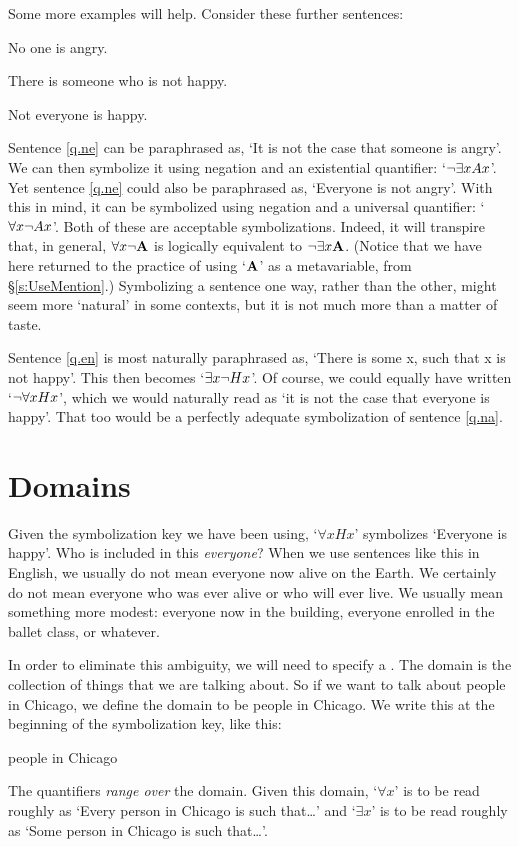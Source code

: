 
Some more examples will help. Consider these further sentences:
	\begin{earg}
		\item[\ex{q.ne}] No one is angry.
		\item[\ex{q.en}] There is someone who is not happy.
		\item[\ex{q.na}] Not everyone is happy.
	\end{earg}
Sentence \ref{q.ne} can be paraphrased as, `It is not the case that someone is angry'. We can then symbolize it using negation and an existential quantifier: `$\neg \exists x Ax$'. Yet sentence \ref{q.ne} could also be paraphrased as, `Everyone is not angry'. With this in mind, it can be symbolized using negation and a universal quantifier: `$\forall x \neg Ax$'. Both of these are acceptable symbolizations.  Indeed, it will transpire that, in general, $\forall x \neg\mathbf{A}$ is logically equivalent to $\neg\exists x\mathbf{A}$. (Notice that we have here returned to the practice of using `$\mathbf{A}$' as a metavariable, from \S\ref{s:UseMention}.) Symbolizing a sentence one way, rather than the other, might seem more `natural' in some contexts, but it is not much more than a matter of taste.

Sentence \ref{q.en} is most naturally paraphrased as, `There is some x, such that x is not happy'. This then becomes `$\exists x \neg Hx$'. Of course, we could equally have written `$\neg\forall x Hx$', which we would naturally read as `it is not the case that everyone is happy'. That too would be a perfectly adequate symbolization of sentence \ref{q.na}.


\section{Domains}
Given the symbolization key we have been using, `$\forall xHx$' symbolizes `Everyone is happy'.  Who is included in this \emph{everyone}? When we use sentences like this in English, we usually do not mean everyone now alive on the Earth. We certainly do not mean everyone who was ever alive or who will ever live. We usually mean something more modest: everyone now in the building, everyone enrolled in the ballet class, or whatever.

In order to eliminate this ambiguity, we will need to specify a . The domain is the collection of things that we are talking about. So if we want to talk about people in Chicago, we define the domain to be people in Chicago. We write this at the beginning of the symbolization key, like this:
	\begin{ekey}
		\item[\text{domain}] people in Chicago
	\end{ekey}
The quantifiers \emph{range over} the domain. Given this domain, `$\forall x$' is to be read roughly as `Every person in Chicago is such that\ldots' and `$\exists x$' is to be read roughly as `Some person in Chicago is such that\ldots'. 

